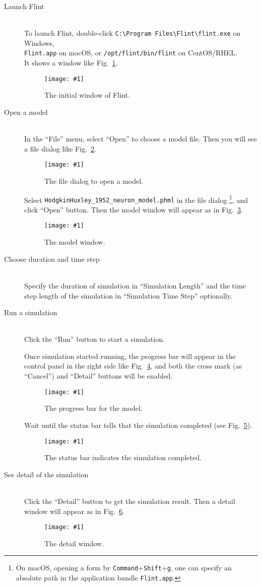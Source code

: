 \documentclass[a4paper,10pt]{report}
\newcommand{\filename}[1]{{\tt #1}}
\newcommand\FigureOfImage[2]{\begin{figure}[h]
  \centering
  \texttt{[image: \#1]}
  \caption{#2}\label{fig:#1}
\end{figure}}
\begin{document}
\begin{description}
\item[Launch Flint] \hfill \\
To launch Flint, double-click
\filename{C:\textbackslash Program Files\textbackslash Flint\textbackslash flint.exe} on Windows,\\
\filename{Flint.app} on macOS, or \filename{/opt/flint/bin/flint} on CentOS/RHEL.\\
It shows a window like Fig.~\ref{fig:initial}.
\FigureOfImage{initial}{The initial window of Flint.}

\item[Open a model] \hfill \\
In the ``File'' menu, select ``Open'' to choose a model file. Then you will see
a file dialog like Fig.~\ref{fig:open-model}.
\FigureOfImage{open-model}{The file dialog to open a model.}
Select \filename{HodgkinHuxley\_1952\_neuron\_model.phml} in the file dialog
\footnote{On macOS, opening a form by {\tt Command}+{\tt Shift}+{\tt g}, one can
specify an absolute path in the application bundle \filename{Flint.app}.},
and click ``Open'' button.
Then the model window will appear as in Fig.~\ref{fig:hh}.
\FigureOfImage{hh}{The model window.}

\item[Choose duration and time step] \hfill \\
Specify the duration of simulation in ``Simulation Length'' and the time step
length of the simulation in ``Simulation Time Step'' optionally.

\item[Run a simulation] \hfill \\
Click the ``Run'' button to start a simulation.

Once simulation started running, the progress bar will appear in the control
panel in the right side like Fig.~\ref{fig:hh-progress}, and both the cross mark
(as ``Cancel'') and ``Detail'' buttons will be enabled.
\FigureOfImage{hh-progress}{The progress bar for the model.}

Wait until the status bar tells that the simulation completed (see
Fig.~\ref{fig:hh-completed}).
\FigureOfImage{hh-completed}{The status bar indicates the simulation completed.}

\item[See detail of the simulation] \hfill \\
Click the ``Detail'' button to get the simulation result.
Then a detail window will appear as in Fig.~\ref{fig:hh-detail}.
\FigureOfImage{hh-detail}{The detail window.}


\end{description}
\end{document}
